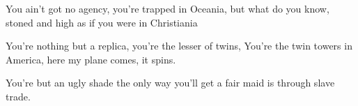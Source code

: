 You ain't got no agency, you're trapped in Oceania,
but what do you know, stoned and high as if you were in Christiania

You're nothing but a replica, you're the lesser of twins,
You're the twin towers in America, here my plane comes, it spins. 

You're but an ugly shade
the only way you'll get a fair maid is through slave trade.